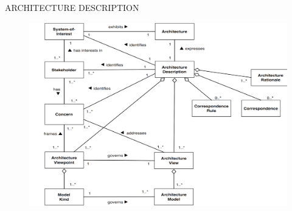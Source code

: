 		\begin{frame}
		\begin{center}
				\begin{LARGE}
					ARCHITECTURE DESCRIPTION
				\end{LARGE}
			\end{center}
		\end{frame}
		
		\begin{frame}
					\begin{figure}
						\begin{center}
							\includegraphics[width=\textwidth]{img/ConceptualModelArchitectureDescription}
						\end{center}
					\end{figure}
		\end{frame}
		
